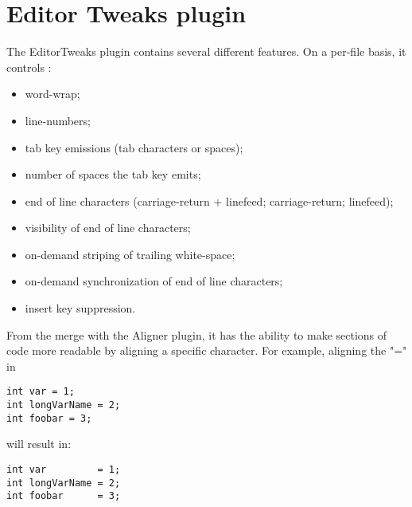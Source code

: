 \section{Editor Tweaks plugin}\label{sec:editor_tweaks}

The EditorTweaks plugin contains several different features. On a per-file basis, it controls :

\begin{itemize}
\item word-wrap;
\item line-numbers;
\item tab key emissions (tab characters or spaces);
\item number of spaces the tab key emits;
\item end of line characters (carriage-return + linefeed; carriage-return; linefeed);
\item visibility of end of line characters;
\item on-demand striping of trailing white-space;
\item on-demand synchronization of end of line characters;
\item insert key suppression.
\end{itemize}

From the merge with the Aligner plugin, it has the ability to make sections of code more readable by aligning a specific character. For example, aligning the "=" in 

\begin{lstlisting}
int var = 1;
int longVarName = 2;
int foobar = 3;
\end{lstlisting}

will result in:

\begin{lstlisting}
int var         = 1;
int longVarName = 2;
int foobar      = 3;
\end{lstlisting}


